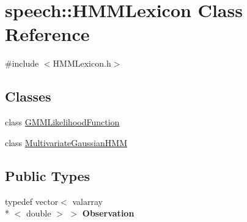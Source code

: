 \hypertarget{classspeech_1_1HMMLexicon}{\section{speech\+:\+:H\+M\+M\+Lexicon Class Reference}
\label{classspeech_1_1HMMLexicon}
}


{\ttfamily \#include $<$H\+M\+M\+Lexicon.\+h$>$}

\subsection*{Classes}
\begin{DoxyCompactItemize}
\item 
class \hyperlink{classspeech_1_1HMMLexicon_1_1GMMLikelihoodFunction}{G\+M\+M\+Likelihood\+Function}
\item 
class \hyperlink{classspeech_1_1HMMLexicon_1_1MultivariateGaussianHMM}{Multivariate\+Gaussian\+H\+M\+M}
\end{DoxyCompactItemize}
\subsection*{Public Types}
\begin{DoxyCompactItemize}
\item 
\hypertarget{classspeech_1_1HMMLexicon_aa8d24ad3e9e92620ee2ce1f4cb783bad}{typedef vector$<$ valarray\\*
$<$ double $>$ $>$ {\bfseries Observation}}\label{classspeech_1_1HMMLexicon_aa8d24ad3e9e92620ee2ce1f4cb783bad}

\end{DoxyCompactItemize}
